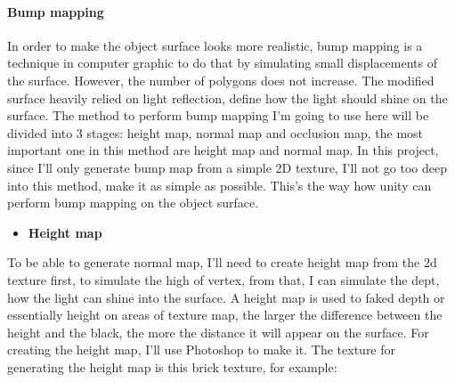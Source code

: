 \documentclass[a4paper, 13pt]{extarticle}
\begin{document}
	\paragraph{Bump mapping}
	In order to make the object surface looks more realistic, bump mapping is a technique in computer graphic to do that by simulating small displacements of the surface. However, the number of polygons does not increase. The modified surface heavily relied on light reflection, define how the light should shine on the surface.
	The method to perform bump mapping I'm going to use here will be divided into 3 stages: height map, normal map and occlusion map, the most important one in this method are height map and normal map. In this project, since I'll only generate bump map from a simple 2D texture, I'll not go too deep into this method, make it as simple as possible. This's the way how unity can perform bump mapping on the object surface.
	\begin{itemize}
		\item \bfseries Height map	 	
	\end{itemize}
		To be able to generate normal map, I'll need to create height map from the 2d texture first, to simulate the high of vertex, from that, I can simulate the dept, how the light can shine into the surface. A height map is used to faked depth or essentially height on areas of texture map, the larger the difference between the height and the black, the more the distance it will appear on the surface. For creating the height map, I'll use Photoshop to make it. The texture for generating  the height map is this brick texture, for example: 
\end{document}
